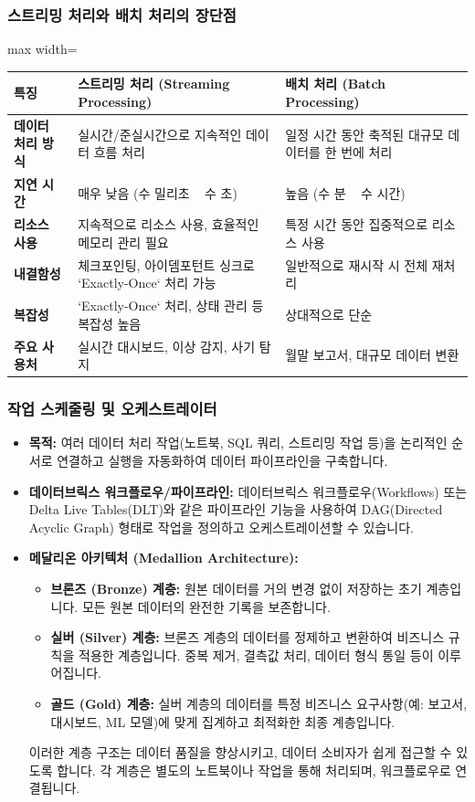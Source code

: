 \documentclass[11pt,a4paper]{article}
\begin{document}
\subsubsection{스트리밍 처리와 배치 처리의 장단점}
\begin{adjustbox}{max width=\textwidth}
\begin{tabular}{lll}
\toprule
\textbf{특징} & \textbf{스트리밍 처리 (Streaming Processing)} & \textbf{배치 처리 (Batch Processing)} \\
\midrule
\textbf{데이터 처리 방식} & 실시간/준실시간으로 지속적인 데이터 흐름 처리 & 일정 시간 동안 축적된 대규모 데이터를 한 번에 처리 \\
\textbf{지연 시간} & 매우 낮음 (수 밀리초 ~ 수 초) & 높음 (수 분 ~ 수 시간) \\
\textbf{리소스 사용} & 지속적으로 리소스 사용, 효율적인 메모리 관리 필요 & 특정 시간 동안 집중적으로 리소스 사용 \\
\textbf{내결함성} & 체크포인팅, 아이뎀포턴트 싱크로 `Exactly-Once` 처리 가능 & 일반적으로 재시작 시 전체 재처리 \\
\textbf{복잡성} & `Exactly-Once` 처리, 상태 관리 등 복잡성 높음 & 상대적으로 단순 \\
\textbf{주요 사용처} & 실시간 대시보드, 이상 감지, 사기 탐지 & 월말 보고서, 대규모 데이터 변환 \\
\bottomrule
\end{tabular}
\end{adjustbox}

\subsubsection{작업 스케줄링 및 오케스트레이터}
\begin{itemize}
    \item \textbf{목적:} 여러 데이터 처리 작업(노트북, SQL 쿼리, 스트리밍 작업 등)을 논리적인 순서로 연결하고 실행을 자동화하여 데이터 파이프라인을 구축합니다.
    \item \textbf{데이터브릭스 워크플로우/파이프라인:} 데이터브릭스 워크플로우(Workflows) 또는 Delta Live Tables(DLT)와 같은 파이프라인 기능을 사용하여 DAG(Directed Acyclic Graph) 형태로 작업을 정의하고 오케스트레이션할 수 있습니다.
    \item \textbf{메달리온 아키텍처 (Medallion Architecture):}
    \begin{itemize}
        \item \textbf{브론즈 (Bronze) 계층:} 원본 데이터를 거의 변경 없이 저장하는 초기 계층입니다. 모든 원본 데이터의 완전한 기록을 보존합니다.
        \item \textbf{실버 (Silver) 계층:} 브론즈 계층의 데이터를 정제하고 변환하여 비즈니스 규칙을 적용한 계층입니다. 중복 제거, 결측값 처리, 데이터 형식 통일 등이 이루어집니다.
        \item \textbf{골드 (Gold) 계층:} 실버 계층의 데이터를 특정 비즈니스 요구사항(예: 보고서, 대시보드, ML 모델)에 맞게 집계하고 최적화한 최종 계층입니다.
    \end{itemize}
    이러한 계층 구조는 데이터 품질을 향상시키고, 데이터 소비자가 쉽게 접근할 수 있도록 합니다. 각 계층은 별도의 노트북이나 작업을 통해 처리되며, 워크플로우로 연결됩니다.
\end{itemize}
\end{document}

